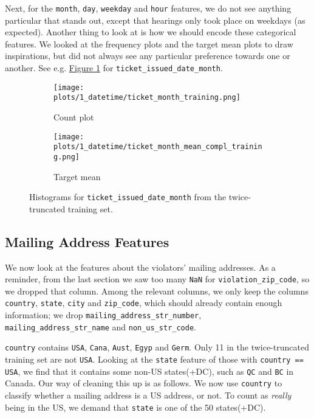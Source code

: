 \documentclass[12pt,letterpaper]{article}
\numberwithin{equation}{section}
\begin{document}
Next, for the \verb|month|, \verb|day|, \verb|weekday| and \verb|hour| features, we do not see anything particular that stands out, except that hearings only took place on weekdays (as expected). Another thing to look at is how we should encode these categorical features. We looked at the frequency plots and the target mean plots to draw inspirations, but did not always see any particular preference towards one or another. See e.g. \hyperref[month]{Figure \ref*{month}} for \verb|ticket_issued_date_month|.


\begin{figure}[H]
\centering
\begin{subfigure}{0.6\textwidth}
  \centering
  \texttt{[image: plots/1\_datetime/ticket\_month\_training.png]}
\caption{Count plot}
\end{subfigure}%
\hspace*{-2cm}
\begin{subfigure}{.6\textwidth}
  \centering
  \texttt{[image: plots/1\_datetime/ticket\_month\_mean\_compl\_training.png]}
  \caption{Target mean}
\end{subfigure}
\caption{Histograms for \texttt{ticket\_issued\_date\_month} from the twice-truncated training set.}
\label{month}
\end{figure}

\subsection{Mailing Address Features}\label{address}

We now look at the features about the violators' mailing addresses. As a reminder, from the last section we saw too many \verb|NaN| for \verb|violation_zip_code|, so we dropped that column. Among the relevant columns, we only keep the columns \verb|country|, \verb|state|, \verb|city| and \verb|zip_code|, which should already contain enough information; we drop \verb|mailing_address_str_number|, \\\verb|mailing_address_str_name| and \verb|non_us_str_code|.

\verb|country| contains \verb|USA|, \verb|Cana|, \verb|Aust|, \verb|Egyp| and \verb|Germ|. Only 11 in the twice-truncated training set are not \verb|USA|. Looking at the \verb|state| feature of those with \verb|country == USA|, we find that it contains some non-US states(+DC), such as \verb|QC| and \verb|BC| in Canada. Our way of cleaning this up is as follows. We now use \verb|country| to classify whether a mailing address is a US address, or not. To count as \textit{really} being in the US, we demand that \verb|state| is one of the 50 states(+DC). 
\end{document}
